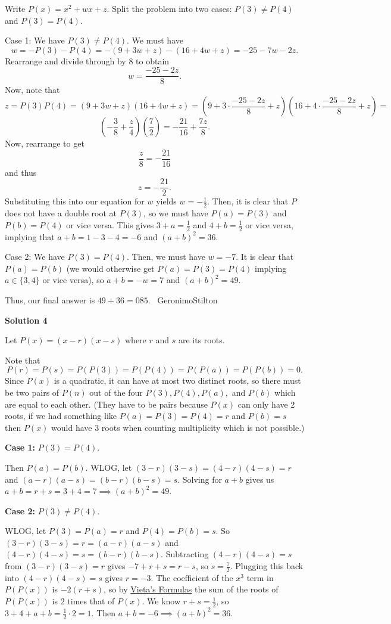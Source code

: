 \begin{enumerate}
Write $P(x) = x^2+wx+z$. Split the problem into two cases: $P(3)\ne P(4)$ and $P(3) = P(4)$.

 Case 1: We have $P(3) \ne P(4)$. We must have 
 \[w=-P(3)-P(4) = -(9+3w+z)-(16+4w+z) = -25-7w-2z.\]Rearrange and divide through by $8$ to obtain
 \[w = \frac{-25-2z}{8}.\]Now, note that
 \[z = P(3)P(4) = (9+3w+z)(16+4w+z) = \left(9 + 3\cdot \frac{-25-2z}{8} + z\right)\left(16 + 4 \cdot \frac{-25-2z}{8} + z\right) =\]
 \[\left(-\frac{3}{8} + \frac{z}{4}\right)\left(\frac{7}{2}\right) = -\frac{21}{16} + \frac{7z}{8}.\]Now, rearrange to get
 \[\frac{z}{8} = -\frac{21}{16}\]and thus
 \[z = -\frac{21}{2}.\]Substituting this into our equation for $w$ yields $w = -\frac{1}{2}$. Then, it is clear that $P$ does not have a double root at $P(3)$, so we must have $P(a) = P(3)$ and $P(b) = P(4)$ or vice versa. This gives $3+a = \frac{1}{2}$ and $4+b = \frac{1}{2}$ or vice versa, implying that $a+b = 1-3-4 = -6$ and $(a+b)^2 = 36$.

 Case 2: We have $P(3) = P(4)$. Then, we must have $w = -7$. It is clear that $P(a) = P(b)$ (we would otherwise get $P(a)=P(3)=P(4)$ implying $a \in \{3,4\}$ or vice versa), so $a+b=-w=7$ and $(a+b)^2 = 49$.

 Thus, our final answer is $49+36=\boxed{085}$. ~GeronimoStilton

 



\textbf{Solution 4}

Let $P(x) = (x - r)(x - s)$ where $r$ and $s$ are its roots. 

 Note that 
 \[P(r) = P(s) = P(P(3)) = P(P(4)) = P(P(a)) = P(P(b)) = 0.\] Since $P(x)$ is a quadratic, it can have at most two distinct roots, so there must be two pairs of $P(n)$ out of the four $P(3), P(4), P(a),$ and $P(b)$ which are equal to each other. (They have to be pairs because $P(x)$ can only have 2 roots, if we had something like $P(a) = P(3) = P(4) = r$ and $P(b) = s$ then $P(x)$ would have $3$ roots when counting multiplicity which is not possible.)  

 
\textbf{Case 1:} $P(3) = P(4).$

 Then $P(a) = P(b).$ WLOG, let $(3 - r)(3 - s)=(4 - r)(4 - s) = r$ and $(a - r)(a - s)=(b - r)(b - s)=s.$ Solving for $a + b$ gives us $a + b = r + s = 3 + 4 = 7 \implies (a + b)^2 = 49.$

 
\textbf{Case 2:} $P(3) \neq P(4).$ 

 WLOG, let $P(3) = P(a) = r$ and $P(4) = P(b) = s.$ So $(3 - r)(3 - s) = r = (a - r)(a - s)$ and $(4 - r)(4 - s) = s = (b - r)(b - s).$ Subtracting $(4 - r)(4 - s) = s$ from $(3 - r)(3 - s) = r$ gives $-7 + r + s = r -s$, so $s = \frac{7}{2}.$ Plugging this back into $(4-r)(4-s) = s$ gives $r = -3.$ The coefficient of the $x^3$ term in $P(P(x))$ is $-2(r+s)$, so by \href{https://artofproblemsolving.com/wiki/index.php?title=Vieta\%27s\_Formulas}{Vieta's Formulas} the sum of the roots of $P(P(x))$ is $2$ times that of $P(x).$ We know $r + s = \frac{1}{2}$, so $3 + 4 + a + b = \frac{1}{2} \cdot 2 = 1.$ Then $a + b = -6 \implies (a + b)^2 = 36.$ 


\end{enumerate}
